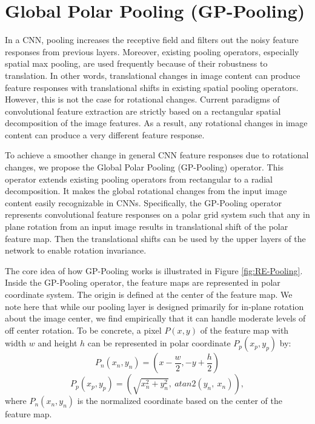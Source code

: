\documentclass[10pt,twocolumn,letterpaper]{article}
\begin{document}
\section{Global Polar Pooling (GP-Pooling)}

In a CNN, pooling increases the receptive field and filters out the noisy feature responses from previous layers. Moreover, existing pooling operators, especially spatial max pooling, are used frequently because of their robustness to translation. In other words, translational changes in image content can produce feature responses with translational shifts in existing spatial pooling operators. However, this is not the case for rotational changes. Current paradigms of convolutional feature extraction are strictly based on a rectangular spatial decomposition of the image features. As a result, any rotational changes in image content can produce a very different feature response.

To achieve a smoother change in general CNN feature responses due to rotational changes, we propose the Global Polar Pooling (GP-Pooling) operator. This operator extends existing pooling operators from rectangular to a radial decomposition. It makes the global rotational changes from the input image content easily recognizable in CNNs. Specifically, the GP-Pooling operator represents convolutional feature responses on a polar grid system such that any in plane rotation from an input image results in translational shift of the polar feature map. Then the translational shifts can be used by the upper layers of the network to enable rotation invariance. 

The core idea of how GP-Pooling works is illustrated in Figure \ref{fig:RE-Pooling}. Inside the GP-Pooling operator, the feature maps are represented in polar coordinate system. The origin is defined at the center of the feature map. We note here that while our pooling layer is designed primarily for in-plane rotation about the image center, we find empirically that it can handle moderate levels of off center rotation. To be concrete, a pixel $P(x, y)$ of the feature map with width $w$ and height $h$ can be represented in polar coordinate $P_p(x_p, y_p)$ by:
\vspace{-0.3cm}
\begin{equation}
    P_n(x_n, y_n) = (x - \frac{w}{2}, -y + \frac{h}{2})    
\end{equation}
\vspace{-0.4cm}
\begin{equation}
    P_p(x_p, y_p) = (\sqrt{x_n^2 + y_n^2}, \ atan2(y_n, \ x_n)),
\end{equation}
where $P_n(x_n, y_n)$ is the normalized coordinate based on the center of the feature map.
\end{document}
